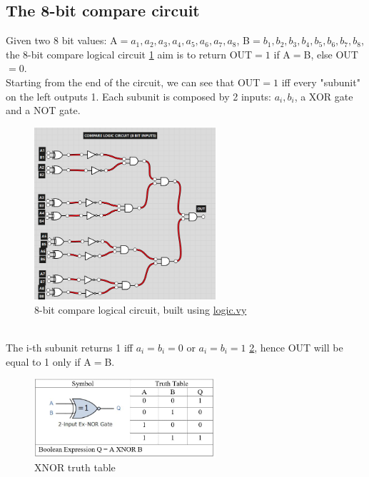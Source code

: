 \documentclass[12pt, letterpaper]{article}
\begin{document}
\subsection{The 8-bit compare circuit}
\label{section:8-bit-cmp}
Given two 8 bit values: A$=a_1,a_2,a_3,a_4,a_5,a_6,a_7,a_8$, B$=b_1,b_2,b_3,b_4,b_5,b_6,b_7,b_8$, the 8-bit compare logical circuit \ref{fig:8bit} aim is to return OUT$=1$ if A$=$B, else OUT$=0$.\\
Starting from the end of the circuit, we can see that OUT$=1$ iff every "subunit" on the left outputs 1. Each subunit is composed by 2 inputs: $a_i, b_i$, a XOR gate and a NOT gate.
\begin{figure}[h]
    \label{fig:8bit}
    \centering
    \includegraphics[width=0.6\textwidth]{8bit_circuit}
    \caption{8-bit compare logical circuit, built using \href{https://logic.ly/demo/}{logic.vy}}
\end{figure}
\\
The i-th subunit returns 1 iff $a_i=b_i=0$ or $a_i=b_i=1$ \ref{fig:XNOR}, hence OUT will be equal to 1 only if A$=$B.
\begin{figure}[H]
    \label{fig:XNOR}
    \centering
    \includegraphics[width=0.6\textwidth]{XNOR}
    \caption{XNOR truth table}
\end{figure}
\end{document}
